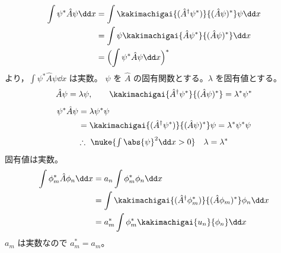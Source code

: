 \begin{align*}
\int\psi^{*}\hat{A}\psi\dd x&=\int\kakimachigai{(\hat{A}^{\dagger}\psi^{*})}{(\hat{A}\psi)^{*}}\psi\dd x\\
&=\int\psi\kakimachigai{\hat{A}\psi^{*}}{(\hat{A}\psi)^{*}}\dd x\\
&=\Bigl(\int\psi^{*}\hat{A}\psi\dd x\Bigr)^{*}
\end{align*}
より，$\int\psi^{*}\hat{A}\psi\dd x$ は実数。
$\psi$ を $\hat{A}$ の固有関数とする。$\lambda$ を固有値とする。
\[ \hat{A}\psi=\lambda\psi,\qquad\kakimachigai{\hat{A}^{\dagger}\psi^{*}}{(\hat{A}\psi)^{*}}=\lambda^{*}\psi^{*} \]
\begin{align*}
\psi^{*}\hat{A}\psi&=\lambda\psi^{*}\psi\\
&=\kakimachigai{(\hat{A}^{\dagger}\psi^{*})}{(\hat{A}\psi)^{*}}\psi=\lambda^{*}\psi^{*}\psi
\end{align*}
\[ \therefore\ \nuke{\textstyle\int\abs{\psi}^{2}\dd x>0}\quad\lambda=\lambda^{*} \]
固有値は実数。
\begin{align*}
\int\phi_{m}^{*}\hat{A}\phi_{n}\dd x&=a_{n}\int\phi_{m}^{*}\phi_{n}\dd x\\
&=\int\kakimachigai{(\hat{A}^{\dagger}\phi_{m}^{*})}{(\hat{A}\phi_{m})^{*}}\phi_{n}\dd x\\
&=a_{m}^{*}\int\phi_{m}^{*}\kakimachigai{u_{n}}{\phi_{n}}\dd x
\end{align*}
$a_{m}$ は実数なので $a_{m}^{*}=a_{m}$。

